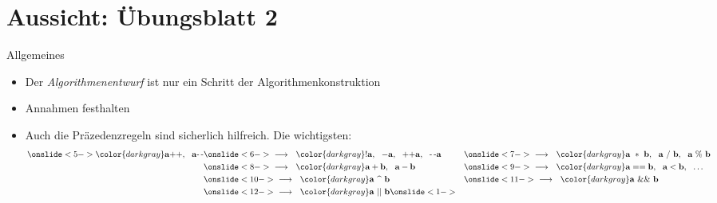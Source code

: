 \section{Aussicht: Übungsblatt 2}
{\def\ms#1{{\color{darkgray}\mathbf{#1}}}
\def\to{~\longrightarrow~}%
\begin{frame}{Allgemeines}
    \begin{itemize}
        \itemsep12pt
        \item<2-> Der \textit{Algorithmenentwurf} ist nur ein Schritt der Algorithmenkonstruktion
        \item<3-> Annahmen festhalten
        \item<4-> Auch die Präzedenzregeln sind sicherlich hilfreich. Die wichtigsten:
        \begin{alignat*}{4}
            \onslide<5->{\ms{a\text{++},~~a\text{-\,-}}}&\onslide<6->{\to~\ms{!a,~~ -a,~~ \text{++}a,~~\text{-\,-}a}}&&\onslide<7->{\to~\ms{a~*~b,~~a~/~b,~~a~\%~b}} \\
            &\onslide<8->{\to~\ms{a+b,~~a-b}}&& \onslide<9->{\to~\ms{a==b,~~a<b,~~\ldots}}\\
            & \onslide<10->{\to~\ms{a~\mbox{\textasciicircum}~b}}&&\onslide<11->{\to~\ms{a~\&\&~b}}\\
            & \onslide<12->{\to~\ms{a~||~b}}
            \onslide<1->
         \end{alignat*}
    \end{itemize}
\end{frame}
}
